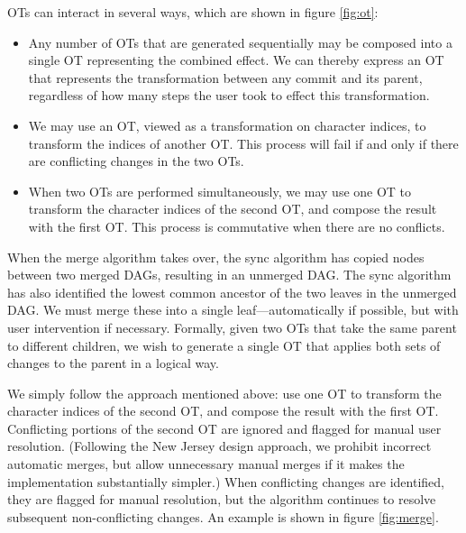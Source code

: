 \documentclass[11pt,titlepage]{article}
\begin{document}
OTs can interact in several ways, which are shown in figure
\ref{fig:ot}:
\begin{itemize}
\item Any number of OTs that are generated sequentially may be
  composed into a single OT representing the combined effect.  We can
  thereby express an OT that represents the transformation between any
  commit and its parent, regardless of how many steps the user took to
  effect this transformation.
\item We may use an OT, viewed as a transformation on character
  indices, to transform the indices of another OT.  This process will
  fail if and only if there are conflicting changes in the two OTs.
\item When two OTs are performed simultaneously, we may use one OT to
  transform the character indices of the second OT, and compose the
  result with the first OT.  This process is commutative when there
  are no conflicts.
\end{itemize}

When the merge algorithm takes over, the sync algorithm has copied
nodes between two merged DAGs, resulting in an unmerged DAG.  The sync
algorithm has also identified the lowest common ancestor of the two
leaves in the unmerged DAG.  We must merge these into a single
leaf---automatically if possible, but with user intervention if
necessary. Formally, given two OTs that take the same parent to
different children, we wish to generate a single OT that applies both
sets of changes to the parent in a logical way.

We simply follow the approach mentioned above: use one OT to transform
the character indices of the second OT, and compose the result with
the first OT.  Conflicting portions of the second OT are ignored and
flagged for manual user resolution.  (Following the New Jersey design
approach, we prohibit incorrect automatic merges, but allow
unnecessary manual merges if it makes the implementation substantially
simpler.)  When conflicting changes are identified, they are flagged
for manual resolution, but the algorithm continues to resolve
subsequent non-conflicting changes.  An example is shown in figure
\ref{fig:merge}.
\end{document}
